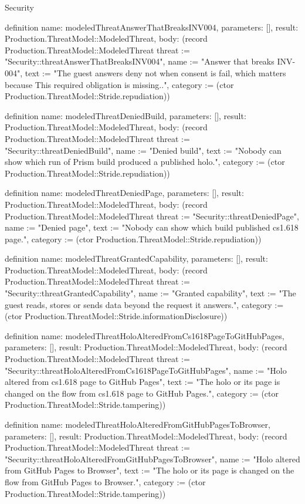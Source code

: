 \begin{lexlean}{Security}
\begin{semanticmodule}
definition{
  name: modeledThreatAnswerThatBreaksINV004,
  parameters: [],
  result: Production.ThreatModel::ModeledThreat,
  body: (record Production.ThreatModel::ModeledThreat {threat := "Security::threatAnswerThatBreaksINV004", name := "Answer that breaks INV-004", text := "The guest answers deny not when consent is fail, which matters because This required obligation is missing..", category := (ctor Production.ThreatModel::Stride.repudiation)})
}

definition{
  name: modeledThreatDeniedBuild,
  parameters: [],
  result: Production.ThreatModel::ModeledThreat,
  body: (record Production.ThreatModel::ModeledThreat {threat := "Security::threatDeniedBuild", name := "Denied build", text := "Nobody can show which run of Prism build produced a published holo.", category := (ctor Production.ThreatModel::Stride.repudiation)})
}

definition{
  name: modeledThreatDeniedPage,
  parameters: [],
  result: Production.ThreatModel::ModeledThreat,
  body: (record Production.ThreatModel::ModeledThreat {threat := "Security::threatDeniedPage", name := "Denied page", text := "Nobody can show which build published cs1.618 page.", category := (ctor Production.ThreatModel::Stride.repudiation)})
}

definition{
  name: modeledThreatGrantedCapability,
  parameters: [],
  result: Production.ThreatModel::ModeledThreat,
  body: (record Production.ThreatModel::ModeledThreat {threat := "Security::threatGrantedCapability", name := "Granted capability", text := "The guest reads, stores or sends data beyond the request it answers.", category := (ctor Production.ThreatModel::Stride.informationDisclosure)})
}

definition{
  name: modeledThreatHoloAlteredFromCs1618PageToGitHubPages,
  parameters: [],
  result: Production.ThreatModel::ModeledThreat,
  body: (record Production.ThreatModel::ModeledThreat {threat := "Security::threatHoloAlteredFromCs1618PageToGitHubPages", name := "Holo altered from cs1.618 page to GitHub Pages", text := "The holo or its page is changed on the flow from cs1.618 page to GitHub Pages.", category := (ctor Production.ThreatModel::Stride.tampering)})
}

definition{
  name: modeledThreatHoloAlteredFromGitHubPagesToBrowser,
  parameters: [],
  result: Production.ThreatModel::ModeledThreat,
  body: (record Production.ThreatModel::ModeledThreat {threat := "Security::threatHoloAlteredFromGitHubPagesToBrowser", name := "Holo altered from GitHub Pages to Browser", text := "The holo or its page is changed on the flow from GitHub Pages to Browser.", category := (ctor Production.ThreatModel::Stride.tampering)})
}


\end{semanticmodule}
\end{lexlean}
